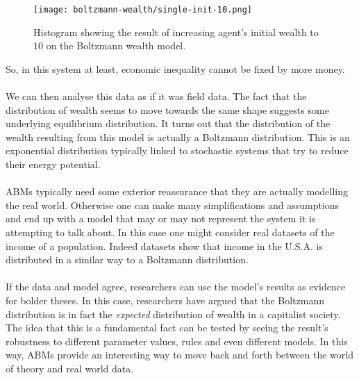 \begin{figure}[h!]
	\centering
	\texttt{[image: boltzmann-wealth/single-init-10.png]}
	\caption{Histogram showing the result of increasing agent's initial wealth to $10$ on the Boltzmann wealth model.}
	\label{fig:single-init-10}
\end{figure}
So, in this system at least, economic inequality cannot be fixed by more money.\\
\\
We can then analyse this data as if it was field data. The fact that the distribution of wealth seems to move towards the same shape suggests some underlying equilibrium distribution. It turns out that the distribution of the wealth resulting from this model is actually a Boltzmann distribution\cite{dragulescu}. This is an exponential distribution typically linked to stochastic systems that try to reduce their energy potential.\\
\\
ABMs typically need some exterior reassurance that they are actually modelling the real world. Otherwise one can make many simplifications and assumptions and end up with a model that may or may not represent the system it is attempting to talk about. In this case one might consider real datasets of the income of a population. Indeed datasets show that income in the U.S.A. is distributed in a similar way to a Boltzmann distribution\cite{econophysics1}.\\
\\
If the data and model agree, researchers can use the model's results as evidence for bolder theses. In this case, researchers have argued that the Boltzmann distribution is in fact the \textit{expected} distribution of wealth in a capitalist society\cite{econophysics1}. The idea that this is a fundamental fact can be tested by seeing the result's robustness to different parameter values, rules and even different models. In this way, ABMs provide an interesting way to move back and forth between the world of theory and real world data.
